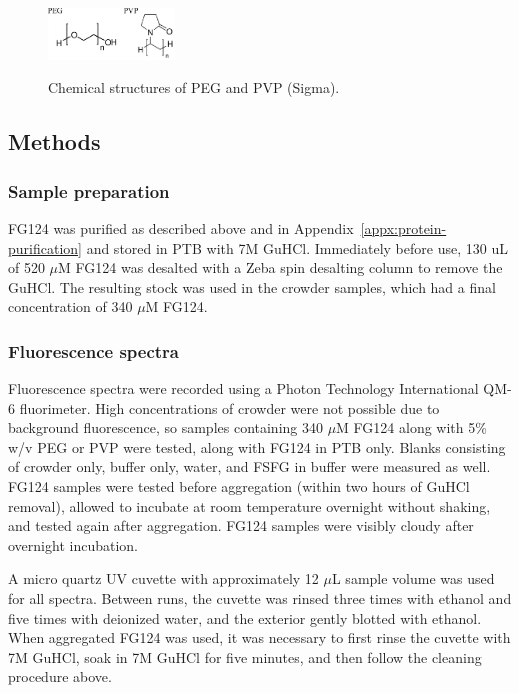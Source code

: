 \begin{figure}
\caption[Chemical structures of PEG and PVP.]{Chemical structures of PEG and PVP (Sigma).}
\centering
\includegraphics[width=0.3\textwidth]{figs/ch05/peg-pvp-structure.pdf}
\label{fig:peg-pvp-struct}
\end{figure}

\subsection{Methods}

\subsubsection{Sample preparation}
FG124 was purified as described above and in Appendix~\ref{appx:protein-purification} and stored in PTB with 7M GuHCl.  Immediately before use, 130 uL of 520 $\mu$M FG124 was desalted with a Zeba spin desalting column to remove the GuHCl.  The resulting stock was used in the crowder samples, which had a final concentration of 340 $\mu$M FG124. 

\subsubsection{Fluorescence spectra}
Fluorescence spectra were recorded using a Photon Technology International QM-6 fluorimeter.  High concentrations of crowder were not possible due to background fluorescence, so samples containing 340 $\mu$M FG124 along with 5\% w/v PEG or PVP were tested, along with FG124 in PTB only.  Blanks consisting of crowder only, buffer only, water, and FSFG in buffer were measured as well.  FG124 samples were tested before aggregation (within two hours of GuHCl removal), allowed to incubate at room temperature overnight without shaking, and tested again after aggregation.  FG124 samples were visibly cloudy after overnight incubation.

A micro quartz UV cuvette with approximately 12 $\mu$L sample volume was used for all spectra.  Between runs, the cuvette was rinsed three times with ethanol and five times with deionized water, and the exterior gently blotted with ethanol.  When aggregated FG124 was used, it was necessary to first rinse the cuvette with 7M GuHCl, soak in 7M GuHCl for five minutes, and then follow the cleaning procedure above.

